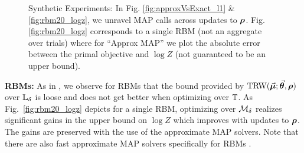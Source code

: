 \begin{figure}[t]
\vspace{-1mm}
\centering
{}
\centering
{}
\centering
{}
\centering
{}
\centering
{}
\centering
{}
\vspace{-3mm}
\caption{\small Synthetic Experiments: 
	In Fig. \ref{fig:approxVsExact_l1} \& \ref{fig:rbm20_logz}, we unravel MAP calls across updates to $\bm{\rho}$.
  Fig. \ref{fig:rbm20_logz} corresponds to a single RBM (not an aggregate over trials) where for
  ``Approx MAP'' we plot the absolute error between the primal
  objective and $\log Z$ (not guaranteed to be an upper bound).}
\vspace{-4mm}
\end{figure}

%

\textbf{RBMs:}
As in \cite{salakhutdinov2008learning}, we observe for RBMs that the bound provided by $\text{TRW}(\vec{\bm{\mu}};\vec{\bm{\theta}},\bm{\rho})$ over $\mathbb{L}_{\delta}$ 
is loose and does not get better when optimizing over 
$\mathbb{T}$.
%
%
As Fig.~\ref{fig:rbm20_logz} 
depicts for a single RBM,
optimizing over $\mathcal{M}_\delta$
realizes significant gains in the upper bound on $\log Z$ which improves with updates to $\bm{\rho}$. 
The gains are preserved with the use of the approximate MAP solvers.
%
%
%
Note that there are also fast approximate MAP solvers specifically for RBMs \citep{sidaw2013rbm}.

